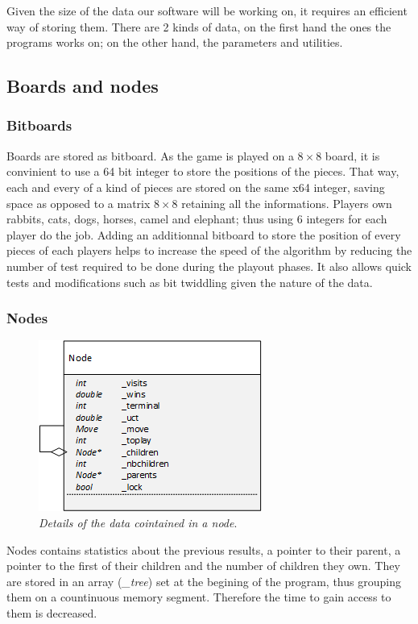 Given the size of the data our software will be working on, it requires an efficient way of storing them. There are 2 kinds of data, on the first hand the ones the programs works on; on the other hand, the parameters and utilities.
\subsection{Boards and nodes}
\subsubsection{Bitboards}
Boards are stored as bitboard. As the game is played on a \ensuremath{8\times8} board, it is convinient to use a 64 bit integer to store the positions of the pieces. That way, each and every of a kind of pieces are stored on the same x64 integer, saving space as opposed to a matrix \ensuremath{8\times8} retaining all the informations. Players own rabbits, cats, dogs, horses, camel and elephant; thus using 6 integers for each player do the job. Adding an additionnal bitboard to store the position of every pieces of each players helps to increase the speed of the algorithm by reducing the number of test required to be done during the playout phases. It also allows quick tests and modifications such as bit twiddling given the nature of the data.

\subsubsection{Nodes}
\begin{figure}[H] 
\centerline{\includegraphics[scale=0.8]{Data_Structure/Img/Node.png}}
\caption{\label{fig:nodedetails}\textit{Details of the data cointained in a node}.}
\end{figure}
Nodes contains statistics about the previous results, a pointer to their parent, a pointer to the first of their children and the number of children they own. They are stored in an array (\textit{\_tree}) set at the begining of the program, thus grouping them on a countinuous memory segment. Therefore the time to gain access to them is decreased.

